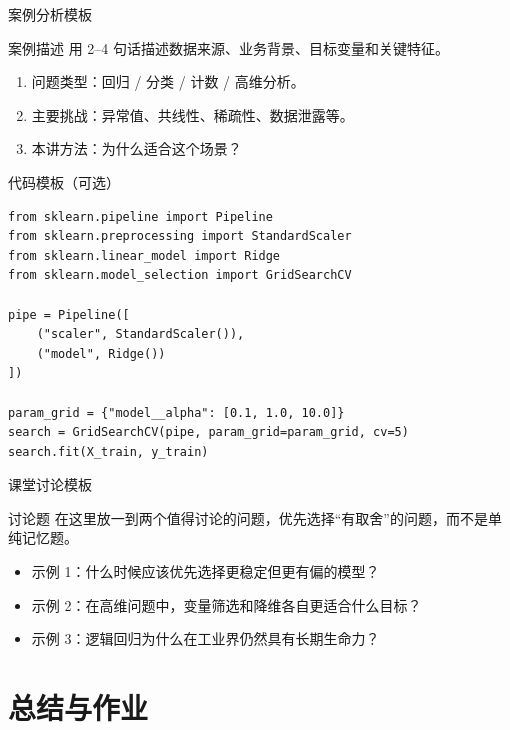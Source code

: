 \documentclass[aspectratio=169,professionalfonts]{beamer}
\begin{document}
\begin{frame}{案例分析模板}
    \begin{block}{案例描述}
        用 2--4 句话描述数据来源、业务背景、目标变量和关键特征。
    \end{block}

    \vspace{0.4em}
    \begin{enumerate}
        \item 问题类型：回归 / 分类 / 计数 / 高维分析。
        \item 主要挑战：异常值、共线性、稀疏性、数据泄露等。
        \item 本讲方法：为什么适合这个场景？
    \end{enumerate}
\end{frame}

\begin{frame}[fragile]{代码模板（可选）}
\small
\begin{verbatim}
from sklearn.pipeline import Pipeline
from sklearn.preprocessing import StandardScaler
from sklearn.linear_model import Ridge
from sklearn.model_selection import GridSearchCV

pipe = Pipeline([
    ("scaler", StandardScaler()),
    ("model", Ridge())
])

param_grid = {"model__alpha": [0.1, 1.0, 10.0]}
search = GridSearchCV(pipe, param_grid=param_grid, cv=5)
search.fit(X_train, y_train)
\end{verbatim}
\end{frame}

\begin{frame}{课堂讨论模板}
    \begin{block}{讨论题}
        在这里放一到两个值得讨论的问题，优先选择“有取舍”的问题，而不是单纯记忆题。
    \end{block}

    \begin{itemize}
        \item 示例 1：什么时候应该优先选择更稳定但更有偏的模型？
        \item 示例 2：在高维问题中，变量筛选和降维各自更适合什么目标？
        \item 示例 3：逻辑回归为什么在工业界仍然具有长期生命力？
    \end{itemize}
\end{frame}

\section{总结与作业}
\end{document}
